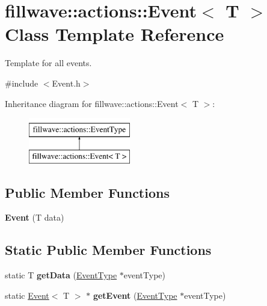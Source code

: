 \hypertarget{classfillwave_1_1actions_1_1Event}{}\section{fillwave\+:\+:actions\+:\+:Event$<$ T $>$ Class Template Reference}
\label{classfillwave_1_1actions_1_1Event}


Template for all events.  




{\ttfamily \#include $<$Event.\+h$>$}

Inheritance diagram for fillwave\+:\+:actions\+:\+:Event$<$ T $>$\+:\begin{figure}[H]
\begin{center}
\leavevmode
\includegraphics[height=2.000000cm]{classfillwave_1_1actions_1_1Event}
\end{center}
\end{figure}
\subsection*{Public Member Functions}
\begin{DoxyCompactItemize}
\item 
\hypertarget{classfillwave_1_1actions_1_1Event_a6169d5fd6bfb41c60831b91294504b05}{}{\bfseries Event} (T data)\label{classfillwave_1_1actions_1_1Event_a6169d5fd6bfb41c60831b91294504b05}

\end{DoxyCompactItemize}
\subsection*{Static Public Member Functions}
\begin{DoxyCompactItemize}
\item 
\hypertarget{classfillwave_1_1actions_1_1Event_a817aeb52af71ead58bd052be5ffae3ee}{}static T {\bfseries get\+Data} (\hyperlink{classfillwave_1_1actions_1_1EventType}{Event\+Type} $\ast$event\+Type)\label{classfillwave_1_1actions_1_1Event_a817aeb52af71ead58bd052be5ffae3ee}

\item 
\hypertarget{classfillwave_1_1actions_1_1Event_aab62154289dcbab43daa2fe26985ab23}{}static \hyperlink{classfillwave_1_1actions_1_1Event}{Event}$<$ T $>$ $\ast$ {\bfseries get\+Event} (\hyperlink{classfillwave_1_1actions_1_1EventType}{Event\+Type} $\ast$event\+Type)\label{classfillwave_1_1actions_1_1Event_aab62154289dcbab43daa2fe26985ab23}

\end{DoxyCompactItemize}


